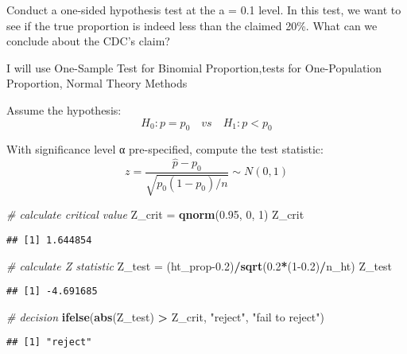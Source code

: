 \documentclass[
]{article}
\newenvironment{Shaded}{\begin{snugshade}}{\end{snugshade}}
\newcommand{\CommentTok}[1]{\textcolor[rgb]{0.56,0.35,0.01}{\textit{#1}}}
\newcommand{\DecValTok}[1]{\textcolor[rgb]{0.00,0.00,0.81}{#1}}
\newcommand{\FloatTok}[1]{\textcolor[rgb]{0.00,0.00,0.81}{#1}}
\newcommand{\FunctionTok}[1]{\textcolor[rgb]{0.13,0.29,0.53}{\textbf{#1}}}
\newcommand{\NormalTok}[1]{#1}
\newcommand{\OtherTok}[1]{\textcolor[rgb]{0.56,0.35,0.01}{#1}}
\newcommand{\SpecialCharTok}[1]{\textcolor[rgb]{0.81,0.36,0.00}{\textbf{#1}}}
\newcommand{\StringTok}[1]{\textcolor[rgb]{0.31,0.60,0.02}{#1}}
\begin{document}
Conduct a one-sided hypothesis test at the a = 0.1 level. In this test,
we want to see if the true proportion is indeed less than the claimed
20\%. What can we conclude about the CDC's claim?

I will use One-Sample Test for Binomial Proportion,tests for
One-Population Proportion, Normal Theory Methods

Assume the hypothesis: \[H_0 : p = p_0 \quad vs \quad H_1 : p < p_0\]

With significance level α pre-specified, compute the test statistic:
\[ z = {\frac{\hat{p} - p_0}{\sqrt{p_0(1 - p_0)/n}}}\sim N(0,1)\]

\begin{Shaded}
\begin{Highlighting}[]
\CommentTok{\# calculate critical value  }
\NormalTok{Z\_crit }\OtherTok{=} \FunctionTok{qnorm}\NormalTok{(}\FloatTok{0.95}\NormalTok{, }\DecValTok{0}\NormalTok{, }\DecValTok{1}\NormalTok{)}
\NormalTok{Z\_crit}
\end{Highlighting}
\end{Shaded}

\begin{verbatim}
## [1] 1.644854
\end{verbatim}

\begin{Shaded}
\begin{Highlighting}[]
\CommentTok{\# calculate Z statistic}
\NormalTok{Z\_test }\OtherTok{=}\NormalTok{ (ht\_prop}\FloatTok{{-}0.2}\NormalTok{)}\SpecialCharTok{/}\FunctionTok{sqrt}\NormalTok{(}\FloatTok{0.2}\SpecialCharTok{*}\NormalTok{(}\DecValTok{1}\FloatTok{{-}0.2}\NormalTok{)}\SpecialCharTok{/}\NormalTok{n\_ht)}
\NormalTok{Z\_test}
\end{Highlighting}
\end{Shaded}

\begin{verbatim}
## [1] -4.691685
\end{verbatim}

\begin{Shaded}
\begin{Highlighting}[]
\CommentTok{\# decision}
\FunctionTok{ifelse}\NormalTok{(}\FunctionTok{abs}\NormalTok{(Z\_test) }\SpecialCharTok{\textgreater{}}\NormalTok{ Z\_crit, }\StringTok{"reject"}\NormalTok{, }\StringTok{"fail to reject"}\NormalTok{)}
\end{Highlighting}
\end{Shaded}

\begin{verbatim}
## [1] "reject"
\end{verbatim}
\end{document}
